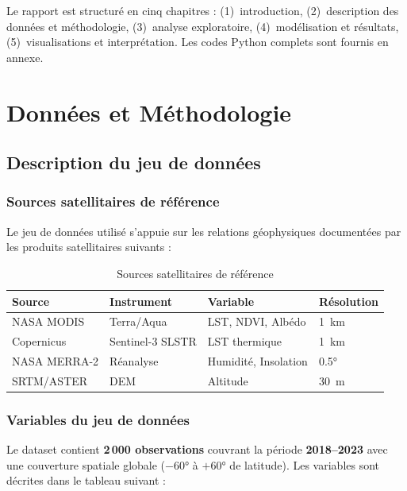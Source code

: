 \documentclass[a4paper,12pt]{report}
\begin{document}
Le rapport est structur\'e en cinq chapitres : (1)~introduction, (2)~description des donn\'ees et m\'ethodologie, (3)~analyse exploratoire, (4)~mod\'elisation et r\'esultats, (5)~visualisations et interpr\'etation. Les codes Python complets sont fournis en annexe.

\newpage
\chapter{Donn\'ees et M\'ethodologie}

\section{Description du jeu de donn\'ees}

\subsection{Sources satellitaires de r\'ef\'erence}

Le jeu de donn\'ees utilis\'e s'appuie sur les relations g\'eophysiques document\'ees par les produits satellitaires suivants :

\begin{table}[H]
\centering
\caption{Sources satellitaires de r\'ef\'erence}
\begin{tabular}{llll}
\toprule
\textbf{Source} & \textbf{Instrument} & \textbf{Variable} & \textbf{R\'esolution} \\
\midrule
NASA MODIS & Terra/Aqua & LST, NDVI, Alb\'edo & 1~km \\
Copernicus & Sentinel-3 SLSTR & LST thermique & 1~km \\
NASA MERRA-2 & R\'eanalyse & Humidit\'e, Insolation & 0.5° \\
SRTM/ASTER & DEM & Altitude & 30~m \\
\bottomrule
\end{tabular}
\label{tab:sources}
\end{table}

\subsection{Variables du jeu de donn\'ees}

Le dataset contient \textbf{2\,000 observations} couvrant la p\'eriode \textbf{2018--2023} avec une couverture spatiale globale ($-60°$ à $+60°$ de latitude). Les variables sont d\'ecrites dans le tableau suivant :
\end{document}
